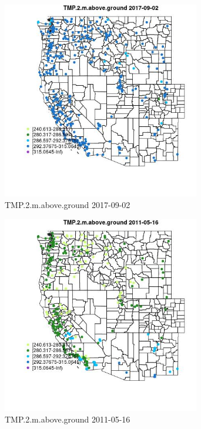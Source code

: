 \begin{figure} 
\centering  
\includegraphics[width=0.77\textwidth]{Code_Outputs/Report_ML_input_PM25_Step4_part_e_de_duplicated_aves_compiled_2019-05-21wNAs_MapObsTMP2maboveground2017-09-02.jpg} 
\caption{\label{fig:Report_ML_input_PM25_Step4_part_e_de_duplicated_aves_compiled_2019-05-21wNAsMapObsTMP2maboveground2017-09-02}TMP.2.m.above.ground 2017-09-02} 
\end{figure} 
 

\begin{figure} 
\centering  
\includegraphics[width=0.77\textwidth]{Code_Outputs/Report_ML_input_PM25_Step4_part_e_de_duplicated_aves_compiled_2019-05-21wNAs_MapObsTMP2maboveground2011-05-16.jpg} 
\caption{\label{fig:Report_ML_input_PM25_Step4_part_e_de_duplicated_aves_compiled_2019-05-21wNAsMapObsTMP2maboveground2011-05-16}TMP.2.m.above.ground 2011-05-16} 
\end{figure} 
 

